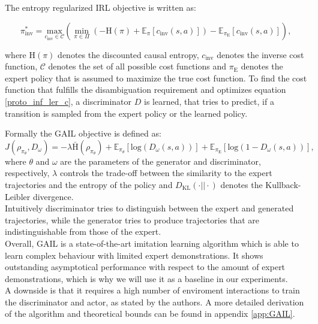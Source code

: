 The entropy regularized IRL objective is written as:

\begin{equation}
    \label{proto_inf_ler_c}
    \pi_{\text{inv}}^* = \underset{c_{\text{inv}} \in \mathcal{C}}{\text{max}} \left( \min_{\pi \in \Pi} \left(- \text{H}(\pi) + \mathbb{E}_{\pi}[c_{\text{inv}}(s, a)] \right) - \mathbb{E}_{\pi_{\text{E}}}[c_{\text{inv}}(s,a)] \right),
\end{equation}
    
where $\text{H}(\pi)$ denotes the discounted causal 
entropy, $c_{\text{inv}}$ denotes the inverse cost function, $\mathcal{C}$ denotes the set of all possible cost functions and $\pi_{\text{E}}$ denotes the expert policy that is assumed to maximize the true cost function.
To find the cost function that fulfills the disambiguation requirement and optimizes equation \ref{proto_inf_ler_c}, a discriminator $D$ is learned, that tries to predict, if a transition is 
sampled from the expert policy or the learned policy.  

Formally the GAIL objective is defined as:
\begin{equation}
    J(\rho_{\pi_{\theta}}, D_{\omega}) =  - \lambda \bar{\text{H}}(\rho_{\pi_{\theta}} ) + \mathbb{E}_{\pi_{\theta}}\left[ \text{log}(D_{\omega}(s,a))\right] + \mathbb{E}_{\pi_{\text{E}}}\left[ \text{log}(1 - D_{\omega}(s,a))\right],
\end{equation}
where $\theta$ and $\omega$ are the parameters of the generator and discriminator, respectively, 
$\lambda$ controls the trade-off between the similarity to the expert trajectories and the entropy of the policy and $D_{\text{KL}}(\cdot || \cdot)$ denotes the Kullback-Leibler divergence. \\
Intuitively discriminator tries to distinguish between the expert and generated trajectories, while the generator tries to produce trajectories that are indistinguishable from those of the expert.\\

Overall, GAIL is a state-of-the-art imitation learning algorithm which is able to learn complex behaviour with limited expert demonstrations. It shows outstanding 
asymptotical performance with respect to the amount of expert demonstrations, which is why we will use it as a baseline in our experiments.\\ 
A downside is that it requires a high number of enviroment interactions to train the discriminator and actor, as stated by the authors. A more detailed derivation of the algorithm and theoretical 
bounds can be found in appendix \ref{app:GAIL}.

